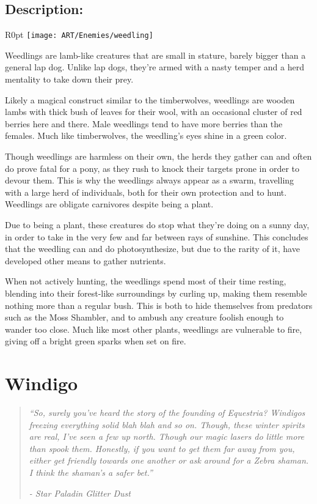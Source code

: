\documentclass[11pt,a4paper,twocolumn]{book}
\begin{document}
	\subsection*{Description:}
	
	\begin{wrapfigure}{R}{0pt}
		\texttt{[image: ART/Enemies/weedling]}
	\end{wrapfigure}
	
	Weedlings are lamb-like creatures that are small in stature, barely bigger than a general lap dog. Unlike lap dogs, they're armed with a nasty temper and a herd mentality to take down their prey.
	
	Likely a magical construct similar to the timberwolves, weedlings are wooden lambs with thick bush of leaves for their wool, with an occasional cluster of red berries here and there. Male weedlings tend to have more berries than the females. Much like timberwolves, the weedling's eyes shine in a green color.
	
	Though weedlings are harmless on their own, the herds they gather can and often do prove fatal for a pony, as they rush to knock their targets prone in order to devour them. This is why the weedlings always appear as a swarm, travelling with a large herd of individuals, both for their own protection and to hunt. Weedlings are obligate carnivores despite being a plant.
	
	Due to being a plant, these creatures do stop what they're doing on a sunny day, in order to take in the very few and far between rays of sunshine. This concludes that the weedling can and do photosynthesize, but due to the rarity of it, have developed other means to gather nutrients.
	
	When not actively hunting, the weedlings spend most of their time resting, blending into their forest-like surroundings by curling up, making them resemble nothing more than a regular bush. This is both to hide themselves from predators such as the Moss Shambler, and to ambush any creature foolish enough to wander too close.
	Much like most other plants, weedlings are vulnerable to fire, giving off a bright green sparks when set on fire. 
	
	\clearpage
	
	\section*{Windigo}
	\begin{quote}
		\emph{``So, surely you've heard the story of the founding of Equestria? Windigos freezing everything solid blah blah and so on. Though, these winter spirits are real, I've seen a few up north. Though our magic lasers do little more than spook them. Honestly, if you want to get them far away from you, either get friendly towards one another or ask around for a Zebra shaman. I think the shaman's a safer bet.''}
		
		\emph{-	Star Paladin Glitter Dust}
	\end{quote}
	
\end{document}
